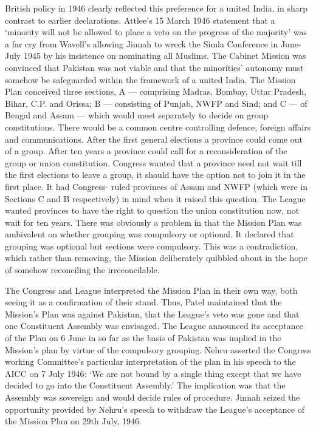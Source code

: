 British policy in 1946 clearly reflected this preference for a united India, in sharp contrast to earlier declarations. Attlee's 15 March 1946 statement that a `minority will not be allowed to place a veto on the progress of the majority' was a far cry from Wavell's allowing Jinnah to wreck the Simla Conference in June- July 1945 by his insistence on nominating all Muslims. The Cabinet Mission was convinced that Pakistan was not viable and that the minorities' autonomy must somehow be safeguarded within the framework of a united India. The Mission Plan conceived three sections, A --- comprising Madras, Bombay, Uttar Pradesh, Bihar, C.P. and Orissa; B --- consisting of Punjab, NWFP and Sind; and C --- of Bengal and Assam --- which would meet separately to decide on group constitutions. There would be a common centre controlling defence, foreign affairs and communications. After the first general elections a province could come out of a group. After ten years a province could call for a reconsideration of the group or union constitution. Congress wanted that a province need not wait till the first elections to leave a group, it should have the option not to join it in the first place. It had Congress- ruled provinces of Assam and NWFP (which were in Sections C and B respectively) in mind when it raised this question. The League wanted provinces to have the right to question the union constitution now, not wait for ten years. There was obviously a problem in that the Mission Plan was ambivalent on whether grouping was compulsory or optional. It declared that grouping was optional but sections were compulsory. This was a contradiction, which rather than removing, the Mission deliberately quibbled about in the hope of somehow reconciling the irreconcilable. 

The Congress and League interpreted the Mission Plan in their own way, both seeing it as a confirmation of their stand. Thus, Patel maintained that the Mission's Plan was against Pakistan, that the League's veto was gone and that one Constituent Assembly was envisaged. The League announced its acceptance of the Plan on 6 June in so far as the basis of Pakistan was implied in the Mission's plan by virtue of the compulsory grouping. Nehru asserted the Congress working Committee's particular interpretation of the plan in his speech to the AICC on 7 July 1946: `We are not bound by a single thing except that we have decided to go into the Constituent Assembly.' The implication was that the Assembly was sovereign and would decide rules of procedure. Jinnah seized the opportunity provided by Nehru's speech to withdraw the League's acceptance of the Mission Plan on 29th July, 1946. 

